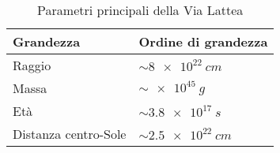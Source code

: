 \begin{table}
\caption{Parametri principali della Via Lattea}
\label{tab:parametri-principali-via-lattea}
\centering
\begin{tabular}{ll}
\toprule
Grandezza & Ordine di grandezza \\
\midrule
Raggio               & $\sim \SI{8e22}{cm}$ \\
Massa                & $\sim \SI{e45}{g}$    \\
Età                  & $\sim \SI{3.8e17}{s}$  \\
Distanza centro-Sole & $\sim \SI{2.5e22}{cm}$  \\
\bottomrule
\end{tabular}
\end{table}